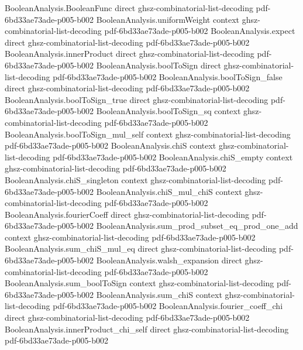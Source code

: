 \begin{lemma}
\proofstep
  {BooleanAnalysis.BooleanFunc}
  {direct}
  {ghsz-combinatorial-list-decoding}
  {pdf-6bd33ae73ade-p005-b002}
\proofstep
  {BooleanAnalysis.uniformWeight}
  {context}
  {ghsz-combinatorial-list-decoding}
  {pdf-6bd33ae73ade-p005-b002}
\proofstep
  {BooleanAnalysis.expect}
  {direct}
  {ghsz-combinatorial-list-decoding}
  {pdf-6bd33ae73ade-p005-b002}
\proofstep
  {BooleanAnalysis.innerProduct}
  {direct}
  {ghsz-combinatorial-list-decoding}
  {pdf-6bd33ae73ade-p005-b002}
\proofstep
  {BooleanAnalysis.boolToSign}
  {direct}
  {ghsz-combinatorial-list-decoding}
  {pdf-6bd33ae73ade-p005-b002}
\proofstep
  {BooleanAnalysis.boolToSign_false}
  {direct}
  {ghsz-combinatorial-list-decoding}
  {pdf-6bd33ae73ade-p005-b002}
\proofstep
  {BooleanAnalysis.boolToSign_true}
  {direct}
  {ghsz-combinatorial-list-decoding}
  {pdf-6bd33ae73ade-p005-b002}
\proofstep
  {BooleanAnalysis.boolToSign_sq}
  {context}
  {ghsz-combinatorial-list-decoding}
  {pdf-6bd33ae73ade-p005-b002}
\proofstep
  {BooleanAnalysis.boolToSign_mul_self}
  {context}
  {ghsz-combinatorial-list-decoding}
  {pdf-6bd33ae73ade-p005-b002}
\proofstep
  {BooleanAnalysis.chiS}
  {context}
  {ghsz-combinatorial-list-decoding}
  {pdf-6bd33ae73ade-p005-b002}
\proofstep
  {BooleanAnalysis.chiS_empty}
  {context}
  {ghsz-combinatorial-list-decoding}
  {pdf-6bd33ae73ade-p005-b002}
\proofstep
  {BooleanAnalysis.chiS_singleton}
  {context}
  {ghsz-combinatorial-list-decoding}
  {pdf-6bd33ae73ade-p005-b002}
\proofstep
  {BooleanAnalysis.chiS_mul_chiS}
  {context}
  {ghsz-combinatorial-list-decoding}
  {pdf-6bd33ae73ade-p005-b002}
\proofstep
  {BooleanAnalysis.fourierCoeff}
  {direct}
  {ghsz-combinatorial-list-decoding}
  {pdf-6bd33ae73ade-p005-b002}
\proofstep
  {BooleanAnalysis.sum_prod_subset_eq_prod_one_add}
  {context}
  {ghsz-combinatorial-list-decoding}
  {pdf-6bd33ae73ade-p005-b002}
\proofstep
  {BooleanAnalysis.sum_chiS_mul_eq}
  {direct}
  {ghsz-combinatorial-list-decoding}
  {pdf-6bd33ae73ade-p005-b002}
\proofstep
  {BooleanAnalysis.walsh_expansion}
  {direct}
  {ghsz-combinatorial-list-decoding}
  {pdf-6bd33ae73ade-p005-b002}
\proofstep
  {BooleanAnalysis.sum_boolToSign}
  {context}
  {ghsz-combinatorial-list-decoding}
  {pdf-6bd33ae73ade-p005-b002}
\proofstep
  {BooleanAnalysis.sum_chiS}
  {context}
  {ghsz-combinatorial-list-decoding}
  {pdf-6bd33ae73ade-p005-b002}
\proofstep
  {BooleanAnalysis.fourier_coeff_chi}
  {direct}
  {ghsz-combinatorial-list-decoding}
  {pdf-6bd33ae73ade-p005-b002}
\proofstep
  {BooleanAnalysis.innerProduct_chi_self}
  {direct}
  {ghsz-combinatorial-list-decoding}
  {pdf-6bd33ae73ade-p005-b002}

\end{lemma}
